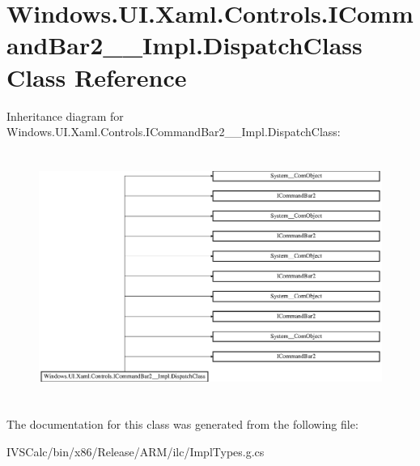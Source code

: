 \hypertarget{class_windows_1_1_u_i_1_1_xaml_1_1_controls_1_1_i_command_bar2_____impl_1_1_dispatch_class}{}\section{Windows.\+U\+I.\+Xaml.\+Controls.\+I\+Command\+Bar2\+\_\+\+\_\+\+Impl.\+Dispatch\+Class Class Reference}
\label{class_windows_1_1_u_i_1_1_xaml_1_1_controls_1_1_i_command_bar2_____impl_1_1_dispatch_class}
Inheritance diagram for Windows.\+U\+I.\+Xaml.\+Controls.\+I\+Command\+Bar2\+\_\+\+\_\+\+Impl.\+Dispatch\+Class\+:\begin{figure}[H]
\begin{center}
\leavevmode
\includegraphics[height=8.169762cm]{class_windows_1_1_u_i_1_1_xaml_1_1_controls_1_1_i_command_bar2_____impl_1_1_dispatch_class}
\end{center}
\end{figure}


The documentation for this class was generated from the following file\+:\begin{DoxyCompactItemize}
\item 
I\+V\+S\+Calc/bin/x86/\+Release/\+A\+R\+M/ilc/Impl\+Types.\+g.\+cs\end{DoxyCompactItemize}
